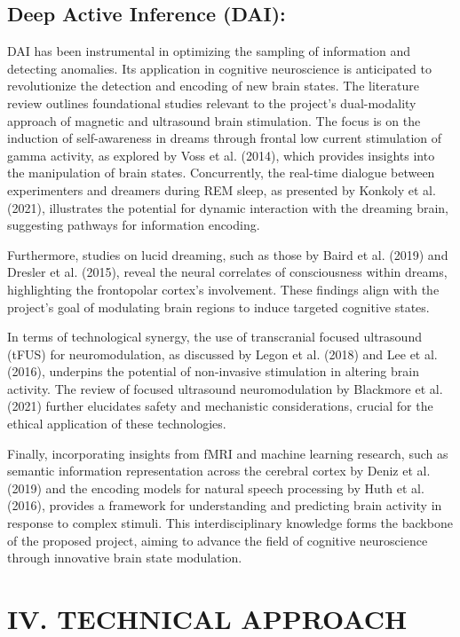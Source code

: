\documentclass{article}
\begin{document}
\subsection*{Deep Active Inference (DAI):}
DAI has been instrumental in optimizing the sampling of information and detecting anomalies. Its application in cognitive neuroscience is anticipated to revolutionize the detection and encoding of new brain states.
The literature review outlines foundational studies relevant to the project's dual-modality approach of magnetic and ultrasound brain stimulation. The focus is on the induction of self-awareness in dreams through frontal low current stimulation of gamma activity, as explored by Voss et al. (2014), which provides insights into the manipulation of brain states. Concurrently, the real-time dialogue between experimenters and dreamers during REM sleep, as presented by Konkoly et al. (2021), illustrates the potential for dynamic interaction with the dreaming brain, suggesting pathways for information encoding.

Furthermore, studies on lucid dreaming, such as those by Baird et al. (2019) and Dresler et al. (2015), reveal the neural correlates of consciousness within dreams, highlighting the frontopolar cortex's involvement. These findings align with the project's goal of modulating brain regions to induce targeted cognitive states.

In terms of technological synergy, the use of transcranial focused ultrasound (tFUS) for neuromodulation, as discussed by Legon et al. (2018) and Lee et al. (2016), underpins the potential of non-invasive stimulation in altering brain activity. The review of focused ultrasound neuromodulation by Blackmore et al. (2021) further elucidates safety and mechanistic considerations, crucial for the ethical application of these technologies.

Finally, incorporating insights from fMRI and machine learning research, such as semantic information representation across the cerebral cortex by Deniz et al. (2019) and the encoding models for natural speech processing by Huth et al. (2016), provides a framework for understanding and predicting brain activity in response to complex stimuli. This interdisciplinary knowledge forms the backbone of the proposed project, aiming to advance the field of cognitive neuroscience through innovative brain state modulation.
\section*{IV. TECHNICAL APPROACH}
\end{document}
